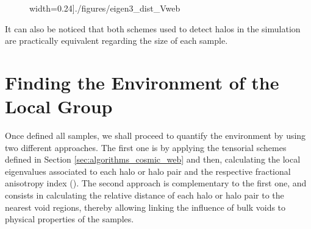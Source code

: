\documentclass[a4,useAMS,usenatbib,usegraphicx]{latex/mn2e}
\begin{document}
\begin{flushleft}
\begin{figure}
\begin{center}
  width=0.24\textheight]{./figures/eigen3_dist_Vweb}
  

  \label{fig:distro_cosmicweb}
  \vspace{0.1 cm}

\end{center}
\end{figure}
\end{flushleft}



It can also be noticed that both schemes used to detect halos in the 
simulation are practically equivalent regarding the size of each sample.



\section{Finding the Environment of the Local Group}
\label{sec:LGEnvironment}



Once defined all samples, we shall proceed to quantify the environment
by using two different approaches. The first one is by applying the 
tensorial schemes defined in Section \ref{sec:algorithms_cosmic_web} 
and then, calculating the local eigenvalues associated to each halo or halo 
pair and the respective fractional anisotropy index (). The second approach is complementary to the first one, and 
consists in calculating the relative distance of each halo or halo pair to 
the nearest void regions, thereby allowing linking the influence of bulk 
voids to physical properties of the samples.
\end{document}
